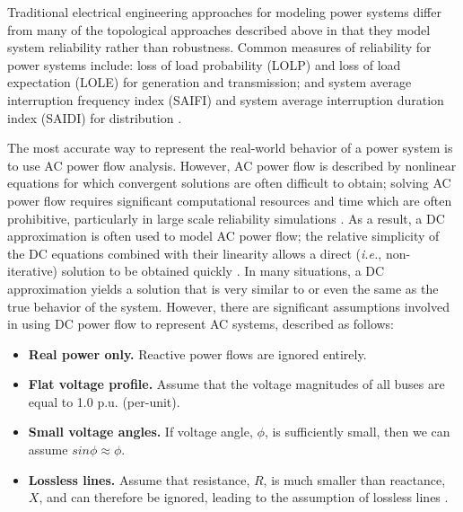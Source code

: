 Traditional electrical engineering approaches for modeling power systems differ from many of the topological approaches described above in that they model system reliability rather than robustness.  Common measures of reliability for power systems include: loss of load probability (LOLP) and loss of load expectation (LOLE) for generation and transmission; and system average interruption frequency index (SAIFI) and system average interruption duration index (SAIDI) for distribution \cite{Allan1994}.  

The most accurate way to represent the real-world behavior of a power system is to use AC power flow analysis.  However, AC power flow is described by nonlinear equations for which convergent solutions are often difficult to obtain; solving AC power flow requires significant computational resources and time which are often prohibitive, particularly in large scale reliability simulations \cite{Overbye2004}. As a result, a DC approximation is often used to model AC power flow; the relative simplicity of the DC equations combined with their linearity allows a direct (\emph{i.e.}, non-iterative) solution to be obtained quickly \cite{Purchala2005}.  In many situations, a DC approximation yields a solution that is very similar to or even the same as the true behavior of the system. However, there are significant assumptions involved in using DC power flow to represent AC systems, described as follows:

\begin{itemize}
\item \textbf{Real power only.} Reactive power flows are ignored entirely.
\item \textbf{Flat voltage profile.} Assume that the voltage magnitudes of all buses are equal to 1.0 p.u. (per-unit).
\item \textbf{Small voltage angles.} If voltage angle, $\phi$, is sufficiently small, then we can assume $sin \phi \approx \phi$.
\item \textbf{Lossless lines.} Assume that resistance, $R$, is much smaller than reactance, $X$, and can therefore be ignored, leading to the assumption of lossless lines \cite{Overbye2004,Purchala2005}.
\end{itemize}

